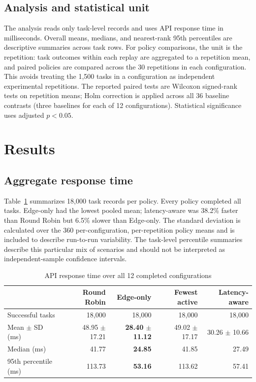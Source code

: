 \documentclass[conference]{IEEEtran}
\begin{document}
        \subsection{Analysis and statistical unit}
        The analysis reads only task-level records and uses API response time in milliseconds. Overall means, medians, and nearest-rank 95th percentiles are descriptive summaries across task rows. For policy comparisons, the unit is the repetition: task outcomes within each replay are aggregated to a repetition mean, and paired policies are compared across the 30 repetitions in each configuration. This avoids treating the 1,500 tasks in a configuration as independent experimental repetitions. The reported paired tests are Wilcoxon signed-rank tests on repetition means; Holm correction is applied across all 36 baseline contrasts (three baselines for each of 12 configurations). Statistical significance uses adjusted $p<0.05$.

        \section{Results}
        \subsection{Aggregate response time}
        Table~\ref{tab:overall} summarizes 18,000 task records per policy. Every policy completed all tasks. Edge-only had the lowest pooled mean; latency-aware was 38.2\% faster than Round Robin but 6.5\% slower than Edge-only. The standard deviation is calculated over the 360 per-configuration, per-repetition policy means and is included to describe run-to-run variability. The task-level percentile summaries describe this particular mix of scenarios and should not be interpreted as independent-sample confidence intervals.

        \begin{table}[t]
        \centering\footnotesize
        \caption{API response time over all 12 completed configurations}
        \label{tab:overall}
        \begin{tabular}{@{}lrrrr@{}}
        \toprule
        & Round Robin & Edge-only & Fewest active & Latency-aware \\
        \midrule
        Successful tasks & 18,000 & 18,000 & 18,000 & 18,000 \\
        Mean $\pm$ SD (ms) & 48.95 $\pm$ 17.21 & \textbf{28.40 $\pm$ 11.12} & 49.02 $\pm$ 17.17 & 30.26 $\pm$ 10.66 \\
        Median (ms) & 41.77 & \textbf{24.85} & 41.85 & 27.49 \\
        95th percentile (ms) & 113.73 & \textbf{53.16} & 113.62 & 57.41 \\
        \bottomrule
        \end{tabular}
        \end{table}
\end{document}
